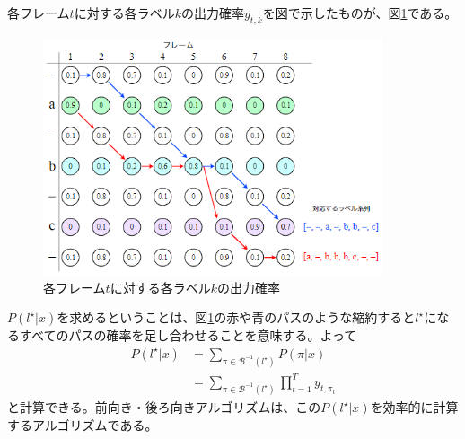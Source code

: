 \documentclass{ltjsarticle}
\begin{document}
\par
各フレーム$t$に対する各ラベル$k$の出力確率$y_{t,k}$を図で示したものが、図\ref{fig:CTC_Frame_Label}である。
\begin{figure}[htbp]
  \centering
  \includegraphics[width=10cm]{./capture/CTC_Frame_Label.png}
  \caption{各フレーム$t$に対する各ラベル$k$の出力確率}
  \label{fig:CTC_Frame_Label}
\end{figure}
$P(l^{\star}|x)$を求めるということは、図\ref{fig:CTC_Frame_Label}の赤や青のパスのような縮約すると$l^{\star}$になるすべてのパスの確率を足し合わせることを意味する。よって
\begin{align}
  P(l^{\star}|x) &= \sum_{\pi \in \mathcal{B}^{-1}(l^{\star})}P(\pi|x)\\
  &= \sum_{\pi \in \mathcal{B}^{-1}(l^{\star})}\prod_{t=1}^{T}y_{t,\pi_t}
\end{align}
と計算できる。前向き・後ろ向きアルゴリズムは、この$P(l^{\star}|x)$を効率的に計算するアルゴリズムである。
\end{document}
